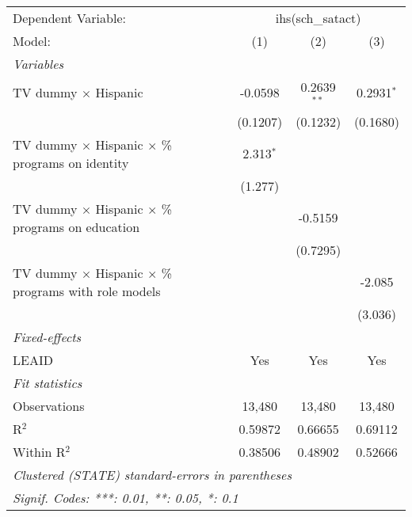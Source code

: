 \begin{tabular}{lccc}
\tabularnewline\midrule\midrule
Dependent Variable:&\multicolumn{3}{c}{ihs(sch\_satact)}\\
Model:&(1) & (2) & (3)\\
\midrule \emph{Variables}&   &   &  \\
TV dummy $\times$ Hispanic & -0.0598 & 0.2639$^{**}$ & 0.2931$^{*}$\\
  &(0.1207) & (0.1232) & (0.1680)\\
TV dummy $\times$ Hispanic $\times$ \% programs on identity & 2.313$^{*}$ &    &   \\
  &(1.277) &    &   \\
TV dummy $\times$ Hispanic $\times$ \% programs on education &    & -0.5159 &   \\
  &   & (0.7295) &   \\
TV dummy $\times$ Hispanic $\times$ \% programs with role models &    &    & -2.085\\
  &   &    & (3.036)\\
\midrule \emph{Fixed-effects}&   &   &  \\
LEAID & Yes & Yes & Yes\\
\midrule \emph{Fit statistics}&  & & \\
Observations & 13,480&13,480&13,480\\
R$^2$ & 0.59872&0.66655&0.69112\\
Within R$^2$ & 0.38506&0.48902&0.52666\\
\midrule\midrule\multicolumn{4}{l}{\emph{Clustered (STATE) standard-errors in parentheses}}\\
\multicolumn{4}{l}{\emph{Signif. Codes: ***: 0.01, **: 0.05, *: 0.1}}\\
\end{tabular}


